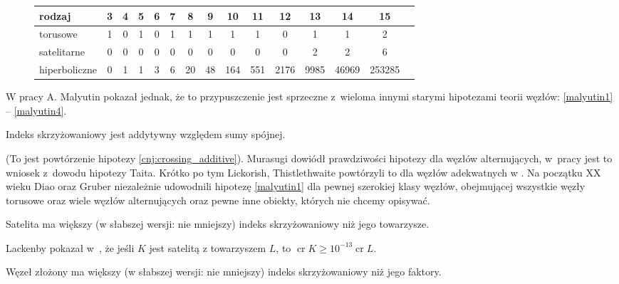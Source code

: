 \begin{figure}[H]
\renewcommand*{\arraystretch}{1.4}
\footnotesize
\begin{longtable}{lcccccccccccccc}
\hline
    \textbf{rodzaj} & 3 & 4 & 5 & 6 & 7 & 8  & 9  & 10  & 11  & 12   & 13   & 14    & 15     \\ \hline \endhead
    torusowe        & 1 & 0 & 1 & 0 & 1 & 1  & 1  & 1   & 1   & 0    & 1    & 1     & 2      \\
    satelitarne     & 0 & 0 & 0 & 0 & 0 & 0  & 0  & 0   & 0   & 0    & 2    & 2     & 6      \\
    hiperboliczne   & 0 & 1 & 1 & 3 & 6 & 20 & 48 & 164 & 551 & 2176 & 9985 & 46969 & 253285 \\
    \hline
\end{longtable}
\normalsize
\end{figure}

W pracy \cite{malyutin16} A. Malyutin pokazał jednak, że to przypuszczenie jest sprzeczne z~wieloma innymi starymi hipotezami teorii węzłów: \ref{malyutin1} -- \ref{malyutin4}.

\begin{conjecture}
    \label{malyutin1}
    Indeks skrzyżowaniowy jest addytywny względem sumy spójnej.
\end{conjecture}

(To jest powtórzenie hipotezy \ref{cnj:crossing_additive}).
Murasugi dowiódł prawdziwości hipotezy dla węzłów alternujących, w~pracy \cite{murasugi87} jest to wniosek z~dowodu hipotezy Taita.
Krótko po tym Lickorish, Thistlethwaite powtórzyli to dla węzłów adekwatnych w \cite{lickorish88}.
Na początku XX wieku Diao \cite{diao04} oraz Gruber \cite{gruber03} niezależnie udowodnili hipotezę \ref{malyutin1} dla pewnej szerokiej klasy węzłów, obejmującej wszystkie węzły torusowe oraz wiele węzłów alternujących oraz pewne inne obiekty, których nie chcemy opisywać.

\begin{conjecture}
    Satelita ma większy (w słabszej wersji: nie mniejszy) indeks skrzyżowaniowy niż jego towarzysze.
\end{conjecture}

Lackenby pokazał w~\cite{lackenby14}, że jeśli $K$ jest satelitą z towarzyszem $L$, to $\operatorname{cr} K \ge 10^{-13} \operatorname{cr} L$.

\begin{conjecture}
    Węzeł złożony ma większy (w słabszej wersji: nie mniejszy) indeks skrzyżowaniowy niż jego faktory.
\end{conjecture}

